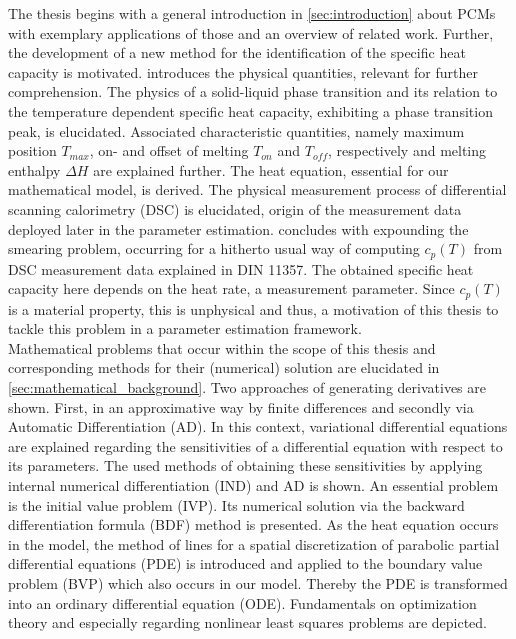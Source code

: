 \documentclass{scrartcl}[12pt, halfparskip]
\numberwithin{equation}{section}
\numberwithin{figure}{section}
\numberwithin{table}{section}
\begin{document}
The thesis begins with a general introduction in \cref{sec:introduction} about PCMs with exemplary applications of those and an overview of related work. 
Further, the development of a new method for the identification of the specific heat capacity is motivated.
 introduces the physical quantities, relevant for further comprehension. 
The physics of a solid-liquid phase transition and its relation to the temperature dependent specific heat capacity, exhibiting a phase transition peak, is elucidated.
Associated characteristic quantities, namely maximum position $T_{max}$, on- and offset of melting $T_{on}$ and $T_{off}$, respectively and melting enthalpy $\Delta H$ are explained further. 
The heat equation, essential for our mathematical model, is derived. 
The physical measurement process of differential scanning calorimetry (DSC) is elucidated, origin of the measurement data deployed later in the parameter estimation. 
 concludes with expounding the smearing problem, occurring for a hitherto usual way of computing $c_p(T)$ from DSC measurement data explained in DIN 11357. 
The obtained specific heat capacity here depends on the heat rate, a measurement parameter. 
Since $c_p(T)$ is a material property, this is unphysical and thus, a motivation of this thesis to tackle this problem in a parameter estimation framework. \\ 
Mathematical problems that occur within the scope of this thesis and corresponding methods for their (numerical) solution are elucidated in \cref{sec:mathematical_background}. 
Two approaches of generating derivatives are shown. 
First, in an approximative way by finite differences and secondly via Automatic Differentiation (AD). 
In this context, variational differential equations are explained regarding the sensitivities of a differential equation with respect to its parameters. 
The used methods of obtaining these sensitivities by applying internal numerical differentiation (IND) and AD is shown. 
An essential problem is the initial value problem (IVP). 
Its numerical solution via the backward differentiation formula (BDF) method is presented. 
As the heat equation occurs in the model, the method of lines for a spatial discretization of parabolic partial differential equations (PDE) is introduced and applied to the boundary value problem (BVP) which also occurs in our model. 
Thereby the PDE is transformed into an ordinary differential equation (ODE).
Fundamentals on optimization theory and especially regarding nonlinear least squares problems are depicted. 
\end{document}
